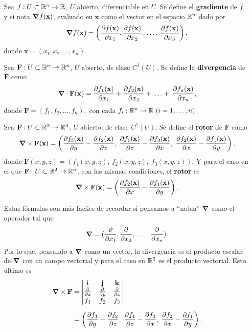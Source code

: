 \begin{definition}
    Sea $f:U\subset\mathbb{R}^n\to\mathbb{R}$, $U$ abierto, diferenciable en $U$. Se define el \textbf{gradiente} de $f$, y si nota $\grad f(\mathbf{x})$, evaluado en $\mathbf{x}$ como el vector en el espacio $\mathbb{R}^n$ dado por 
    \[
        \grad f(\mathbf{x})=\left(\frac{\partial f(\mathbf{x})}{\partial x_1},\frac{\partial f(\mathbf{x})}{\partial x_2},\:\ldots,\: \frac{\partial f(\mathbf{x})}{\partial x_n}\right),
    \]
    donde $\mathbf{x}=(x_1, x_2,\ldots, x_n)$.   
\end{definition}
\begin{definition}
    Sea $\mathbf{F}:U\subset\mathbb{R}^n\to\mathbb{R}^n$, $U$ abierto, de clase $C^1(U)$. Se define la \textbf{divergencia} de $\mathbf{F}$ como
    \[
        \grad\cdot \mathbf{F}(\mathbf{x})=\frac{\partial f_1(\mathbf{x})}{\partial x_1}+\frac{\partial f_2(\mathbf{x})}{\partial x_2}+\:\ldots+\: \frac{\partial f_n(\mathbf{x})}{\partial x_n},
    \]
    donde $\mathbf{F}=(f_1,f_2,\ldots,f_n),$ con cada $f_i:\mathbb{R}^n\to\mathbb{R}\;(i=1,\ldots,n).$
\end{definition}
\begin{definition}
    Sea $\mathbf{F}:U\subset\mathbb{R}^3\to\mathbb{R}^3$, $U$ abierto, de clase $C^1(U)$. Se define el \textbf{rotor} de $\mathbf{F}$ como 
    \[
        \grad\times\mathbf{F}(\mathbf{x})=\left(\frac{\partial f_3(\mathbf{x})}{\partial y}-\frac{\partial f_2(\mathbf{x})}{\partial z},\;\frac{\partial f_1(\mathbf{x})}{\partial z}-\frac{\partial f_3(\mathbf{x})}{\partial x},\;\frac{\partial f_2(\mathbf{x})}{\partial x}-\frac{\partial f_1(\mathbf{x})}{\partial y}\right),
    \]   
    donde $\mathbf{F}(x,y,z)=(f_1(x,y,z),\:f_2(x,y,z),\:f_3(x,y,z))$.
    Y para el caso en el que $\mathbf{F}:U\subset\mathbb{R}^2\to\mathbb{R}^n$, con las mismas condiciones, el \textbf{rotor} es
    \[
        \grad\times\mathbf{F}(\mathbf{x})=\left(\frac{\partial f_2(\mathbf{x})}{\partial x}-\frac{\partial f_1(\mathbf{x})}{\partial y}\right).
    \]
\end{definition}
    Estas f\'ormulas son m\'as faciles de recordar si pensamos a ``nabla'' $\grad$ como el operador tal que 
    \[
        \grad = (\frac{\partial}{\partial x_1},\frac{\partial}{\partial x_2},\:\ldots,\: \frac{\partial}{\partial x_n}).  
    \]
    Por lo que, pensando a $\grad$ como un vector, la divergencia es el producto escalar de $\grad$ con un campo vectorial y para el caso en $\mathbb{R}^3$ es el producto vectorial. Esto \'ultimo es
    \begin{align*}
        \grad\times\mathbf{F}&= 
        \begin{vmatrix}
        \mathbf{i} & \mathbf{j} & \mathbf{k} \\
        \frac{\partial}{\partial x} & \frac{\partial}{\partial y} & \frac{\partial}{\partial z} \\
        f_1 & f_2 & f_3
        \end{vmatrix} \\[.2cm]
        &=\left(\frac{\partial f_3}{\partial y}-\frac{\partial f_2}{\partial z},\;\frac{\partial f_1}{\partial z}-\frac{\partial f_3}{\partial x},\;\frac{\partial f_2}{\partial x}-\frac{\partial f_1}{\partial y}\right).
    \end{align*}
